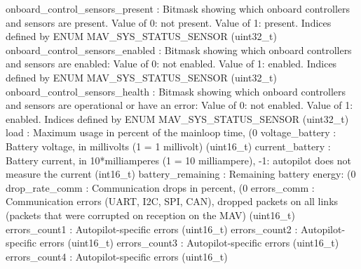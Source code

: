 \begin{DoxyVerb}
\begin{DoxyVerb}
\begin{DoxyVerb}
\begin{DoxyVerb}
\begin{DoxyVerb}
\begin{DoxyVerb}
\begin{DoxyVerb}
\begin{DoxyVerb}
\begin{DoxyVerb}
\begin{DoxyVerb}
\begin{DoxyVerb}
onboard_control_sensors_present        : Bitmask showing which onboard controllers and sensors are present. Value of 0: not present. Value of 1: present. Indices defined by ENUM MAV_SYS_STATUS_SENSOR (uint32_t)
onboard_control_sensors_enabled        : Bitmask showing which onboard controllers and sensors are enabled:  Value of 0: not enabled. Value of 1: enabled. Indices defined by ENUM MAV_SYS_STATUS_SENSOR (uint32_t)
onboard_control_sensors_health        : Bitmask showing which onboard controllers and sensors are operational or have an error:  Value of 0: not enabled. Value of 1: enabled. Indices defined by ENUM MAV_SYS_STATUS_SENSOR (uint32_t)
load                      : Maximum usage in percent of the mainloop time, (0%
voltage_battery           : Battery voltage, in millivolts (1 = 1 millivolt) (uint16_t)
current_battery           : Battery current, in 10*milliamperes (1 = 10 milliampere), -1: autopilot does not measure the current (int16_t)
battery_remaining         : Remaining battery energy: (0%
drop_rate_comm            : Communication drops in percent, (0%
errors_comm               : Communication errors (UART, I2C, SPI, CAN), dropped packets on all links (packets that were corrupted on reception on the MAV) (uint16_t)
errors_count1             : Autopilot-specific errors (uint16_t)
errors_count2             : Autopilot-specific errors (uint16_t)
errors_count3             : Autopilot-specific errors (uint16_t)
errors_count4             : Autopilot-specific errors (uint16_t)\end{DoxyVerb}
 \mbox{\label{classpymavlink_1_1dialects_1_1v10_1_1MAVLink_a42d1d894ef57669fb8790d2500068209}} 

\end{DoxyVerb}
\end{DoxyVerb}
\end{DoxyVerb}
\end{DoxyVerb}
\end{DoxyVerb}
\end{DoxyVerb}
\end{DoxyVerb}
\end{DoxyVerb}
\end{DoxyVerb}
\end{DoxyVerb}
